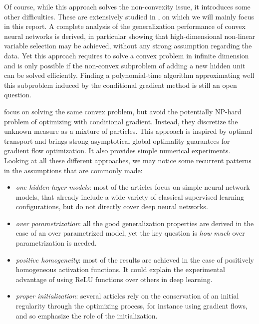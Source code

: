 \documentclass[a4paper, 11pt]{scrartcl}
\begin{document}
{Of course, while this approach solves the non-convexity issue, it introduces some other difficulties. These are extensively studied in \cite{bach2017breaking}, on which we will mainly focus in this report. A complete analysis of the generalization performance of convex neural networks is derived, in particular showing that high-dimensional non-linear variable selection may be achieved, without any strong assumption regarding the data. Yet this approach requires to solve a convex problem in infinite dimension and is only possible if the non-convex subproblem of adding a new hidden unit can be solved efficiently. Finding a polynomial-time algorithm approximating well this subproblem induced by the conditional gradient method is still an open question.

\cite{chizat2018global} focus on solving the same convex problem, but avoid the potentially NP-hard problem of optimizing with conditional gradient. Instead, they discretize the unknown measure as a mixture of particles. This approach is inspired by optimal transport and brings strong asymptotical global optimality guarantees for gradient flow optimization. It also provides simple numerical experiments.\\

Looking at all these different approaches, we may notice some recurrent patterns in the assumptions that are commonly made:

\begin{itemize}
\item \textit{one hidden-layer models}: most of the articles focus on simple neural network models, that already include a wide variety of classical supervised learning configurations, but do not directly cover deep neural networks.
\item \textit{over parametrization}: all the good generalization properties are derived in the case of an over parametrized model, yet the key question is \textit{how much} over parametrization is needed.
\item \textit{positive homogeneity}: most of the results are achieved in the case of positively homogeneous activation functions. It could explain the experimental advantage of using ReLU functions over others in deep learning.
\item \textit{proper initialization}: several articles rely on the conservation of an initial regularity through the optimizing process, for instance using gradient flows, and so emphasize the role of the initialization.
\end{itemize}

}
\end{document}
